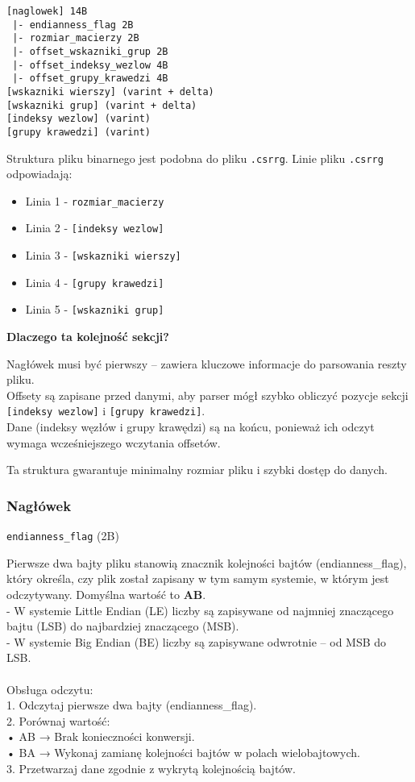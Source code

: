 \documentclass[]{article}
\begin{document}
\begin{lstlisting}[numbers=NULL]
[naglowek] 14B  
 |- endianness_flag 2B
 |- rozmiar_macierzy 2B  
 |- offset_wskazniki_grup 2B
 |- offset_indeksy_wezlow 4B  
 |- offset_grupy_krawedzi 4B   
[wskazniki wierszy] (varint + delta)  
[wskazniki grup] (varint + delta)  
[indeksy wezlow] (varint)
[grupy krawedzi] (varint)
\end{lstlisting}
Struktura pliku binarnego jest podobna do pliku \texttt{.csrrg}. Linie pliku \texttt{.csrrg} odpowiadają:
\begin{itemize}
    \item Linia 1 - \texttt{rozmiar\_macierzy}
    \item Linia 2 - \texttt{[indeksy wezlow]}
    \item Linia 3 - \texttt{[wskazniki wierszy]}
    \item Linia 4 - \texttt{[grupy krawedzi]}
    \item Linia 5 - \texttt{[wskazniki grup]}
\end{itemize}
\textbf{Dlaczego ta kolejność sekcji?}

Nagłówek musi być pierwszy – zawiera kluczowe informacje do parsowania reszty pliku.\\
Offsety są zapisane przed danymi, aby parser mógł szybko obliczyć pozycje sekcji \texttt{[indeksy wezlow]} i \texttt{[grupy krawedzi]}.\\
Dane (indeksy węzłów i grupy krawędzi) są na końcu, ponieważ ich odczyt wymaga wcześniejszego wczytania offsetów.

Ta struktura gwarantuje minimalny rozmiar pliku i szybki dostęp do danych.


\subsubsection{Nagłówek}

\texttt{endianness\_flag} (2B)
\begin{itemize}
Pierwsze dwa bajty pliku stanowią znacznik kolejności bajtów (endianness\_flag), który określa, czy plik został zapisany w tym samym systemie, w którym jest odczytywany. Domyślna wartość to \textbf{AB}.\\
	 - W systemie Little Endian (LE) liczby są zapisywane od najmniej  znaczącego bajtu (LSB) do najbardziej znaczącego (MSB).\\
	 - W systemie Big Endian (BE) liczby są zapisywane odwrotnie – od MSB do LSB.
     \\
     \\
Obsługa odczytu:\\
	1.	Odczytaj pierwsze dwa bajty (endianness\_flag).\\
	2.	Porównaj wartość:\\
	•	AB → Brak konieczności konwersji.\\
	•	BA → Wykonaj zamianę kolejności bajtów w polach wielobajtowych.\\
	3.	Przetwarzaj dane zgodnie z wykrytą kolejnością bajtów.
\end{itemize}
\end{document}
